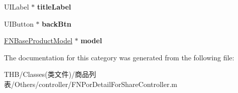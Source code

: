 \begin{DoxyCompactItemize}
U\+I\+Label $\ast$ {\bfseries title\+Label}
\item 
\mbox{\label{category_f_n_por_detail_for_share_controller_07_08_a3600bf2b895b41e591d4a30adb387e92}} 
U\+I\+Button $\ast$ {\bfseries back\+Btn}
\item 
\mbox{\label{category_f_n_por_detail_for_share_controller_07_08_a1abd2cce4c6951c43a2550ba3cbb5a04}} 
\mbox{\hyperlink{interface_f_n_base_product_model}{F\+N\+Base\+Product\+Model}} $\ast$ {\bfseries model}
\end{DoxyCompactItemize}


The documentation for this category was generated from the following file\+:\begin{DoxyCompactItemize}
\item 
T\+H\+B/\+Classes(类文件)/商品列表/\+Others/controller/F\+N\+Por\+Detail\+For\+Share\+Controller.\+m\end{DoxyCompactItemize}
